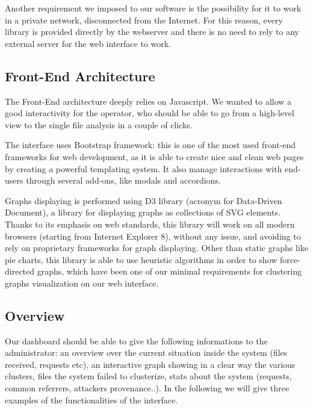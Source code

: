 Another requirement we imposed to our software is the possibility for it to work in a private network, disconnected from the Internet. For this reason, every library is provided directly by the webserver and there is no need to rely to any external server for the web interface to work.

\subsection{Front-End Architecture}

The Front-End architecture deeply relies on Javascript. We wanted to allow a good interactivity for the operator, who should be able to go from a high-level view to the single file analysis in a couple of clicks.

The interface uses Bootstrap \cite{bootstrap} framework: this is one of the most used front-end frameworks for web development, as it is able to create nice and clean web pages by creating a powerful templating system. It also manage interactions with end-users through several add-ons, like modals and accordions.

Graphs displaying is performed using D3 library \cite{d3_home} (acronym for Data-Driven Document), a library for displaying graphs as collections of SVG elements. Thanks to its emphasis on web standards, this library will work on all modern browsers (starting from Internet Explorer 8), without any issue, and avoiding to rely on proprietary frameworks for graph displaying. Other than static graphs like pie charts, this library is able to use heuristic algorithms in order  to show force-directed graphs, which have been one of our minimal requirements for clustering graphs visualization on our web interface.

\subsection{Overview}

Our dashboard should be able to give the following informations to the administrator: an overview over the current situation inside the system (files received, requests etc), an interactive graph showing in a clear way the various clusters, files the system failed to clusterize, stats about the system (requests, common referrers, attackers provenance..). In the following we will give three examples of the functionalities of the interface.

